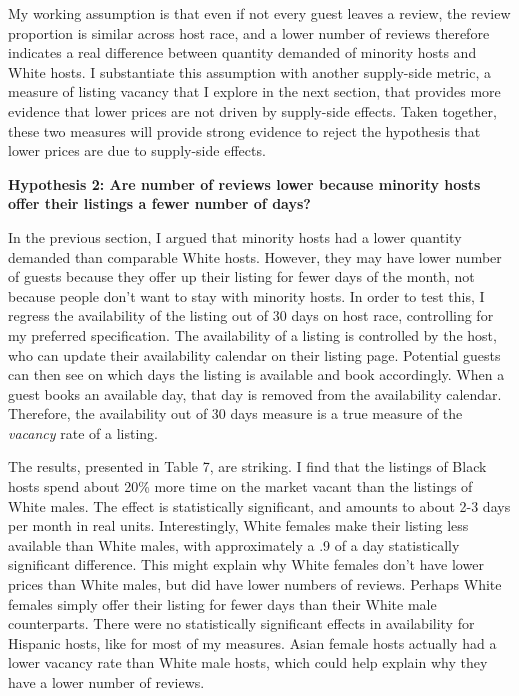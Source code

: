 \documentclass[11pt, oneside]{article}
\begin{document}
My working assumption is that even if not every guest leaves a review, the review proportion is similar across host race, and a lower number of reviews therefore indicates a real difference between quantity demanded of minority hosts and White hosts. I substantiate this assumption with another supply-side metric, a measure of listing vacancy that I explore in the next section, that provides more evidence that lower prices are not driven by supply-side effects. Taken together, these two measures will provide strong evidence to reject the hypothesis that lower prices are due to supply-side effects. 
    
    
\textbf{Hypothesis 2: Are number of reviews lower because minority hosts offer their listings a fewer number of days?}

In the previous section, I argued that minority hosts had a lower quantity demanded than comparable White hosts. However, they may have lower number of guests because they offer up their listing for fewer days of the month, not because people don't want to stay with minority hosts. In order to test this, I regress the availability of the listing out of 30 days on host race, controlling for my preferred specification. The availability of a listing is controlled by the host, who can update their availability calendar on their listing page. Potential guests can then see on which days the listing is available and book accordingly. When a guest books an available day, that day is removed from the availability calendar. Therefore, the availability out of 30 days measure is a true measure of the \textit{vacancy} rate of a listing.

The results, presented in Table 7, are striking. I find that the listings of Black hosts spend about 20\% more time on the market vacant than the listings of White males. The effect is statistically significant, and amounts to about 2-3 days per month in real units. Interestingly, White females make their listing less available than White males, with approximately a .9 of a day statistically significant difference. This might explain why White females don't have lower prices than White males, but did have lower numbers of reviews. Perhaps White females simply offer their listing for fewer days than their White male counterparts. There were no statistically significant effects in availability for Hispanic hosts, like for most of my measures. Asian female hosts actually had a lower vacancy rate than White male hosts, which could help explain why they have a lower number of reviews. 
\end{document}
